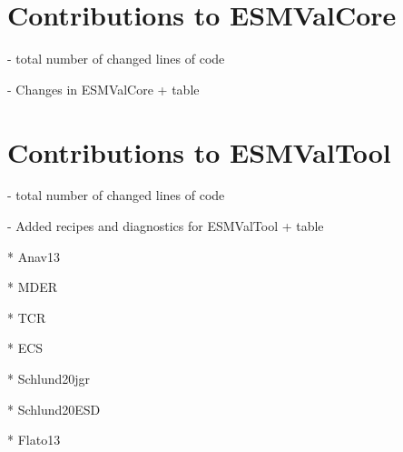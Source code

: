 \section{Contributions to \acs{ESMValCore}}
\label{sec:03:contributions_to_esmvalcore}

- total number of changed lines of code

- Changes in \ac{ESMValCore} + table


\section{Contributions to \acs{ESMValTool}}
\label{sec:03:contributions_to_esmvaltool}

- total number of changed lines of code

- Added recipes and diagnostics for ESMValTool + table

* Anav13

* MDER

* TCR

* ECS

* Schlund20jgr

* Schlund20ESD

* Flato13